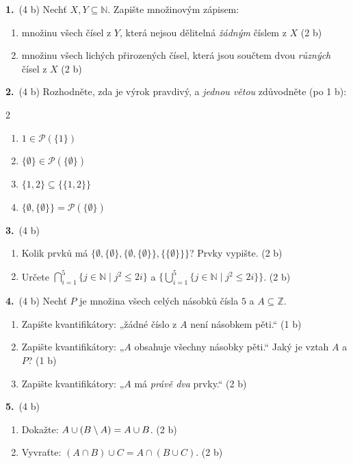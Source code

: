 \documentclass[11pt,a4paper]{article}
\newcommand{\N}{\mathbb N}\newcommand{\Z}{\mathbb Z}\newcommand{\Pot}{\mathcal P}
\newenvironment{pol}{\begin{enumerate}[label=(\alph*),leftmargin=2em,itemsep=3pt]}{\end{enumerate}}
\newenvironment{dvasl}{\begin{multicols}{2}\begin{enumerate}[label=(\alph*),leftmargin=2em,itemsep=3pt]}{\end{enumerate}\end{multicols}}
\begin{document}
\textbf{1.}\ (4 b) Nechť $X,Y\subseteq\N$. Zapište množinovým zápisem:
\begin{pol}
  \item množinu všech čísel z $Y$, která nejsou dělitelná \emph{žádným} číslem z $X$ \hfill (2 b)
  \item množinu všech lichých přirozených čísel, která jsou součtem dvou \emph{různých} čísel z $X$ \hfill (2 b)
\end{pol}


\textbf{2.}\ (4 b) Rozhodněte, zda je výrok pravdivý, a \emph{jednou větou} zdůvodněte (po 1 b):
\begin{dvasl}
  \item $1\in\mathcal P(\{1\})$
  \item $\{\emptyset\}\in\mathcal P(\{\emptyset\})$
  \item $\{1,2\}\subseteq\{\{1,2\}\}$
  \item $\{\emptyset,\{\emptyset\}\}=\mathcal P(\{\emptyset\})$
\end{dvasl}


\textbf{3.}\ (4 b)
\begin{pol}
  \item Kolik prvků má $\{\emptyset,\{\emptyset\},\{\emptyset,\{\emptyset\}\},\{\{\emptyset\}\}\}$? Prvky vypište. \hfill (2 b)
  \item Určete $\bigcap_{i=1}^{5}\{j\in\N\mid j^2\le2i\}$ a $\Big\{\bigcup_{i=1}^{5}\{j\in\N\mid j^2\le2i\}\Big\}$. \hfill (2 b)
\end{pol}


\textbf{4.}\ (4 b) Nechť $P$ je množina všech celých násobků čísla $5$ a $A\subseteq\Z$.
\begin{pol}
  \item Zapište kvantifikátory: „žádné číslo z $A$ není násobkem pěti.“ \hfill (1 b)
  \item Zapište kvantifikátory: „$A$ obsahuje všechny násobky pěti.“ Jaký je vztah $A$ a $P$? \hfill (1 b)
  \item Zapište kvantifikátory: „$A$ má \emph{právě dva} prvky.“ \hfill (2 b)
\end{pol}


\textbf{5.}\ (4 b)
\begin{pol}
  \item Dokažte: $A\cup(B\setminus A)=A\cup B$. \hfill (2 b)
  \item Vyvraťte: $(A\cap B)\cup C=A\cap(B\cup C)$. \hfill (2 b)
\end{pol}
\end{document}
